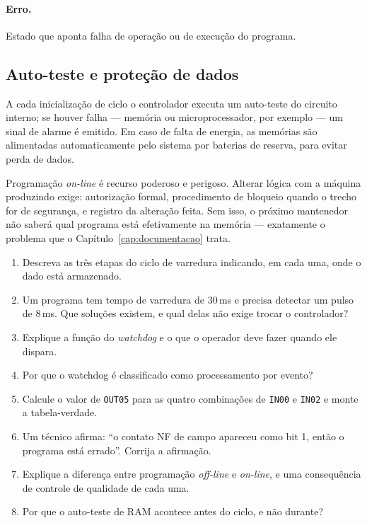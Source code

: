 \paragraph{Erro.} Estado que aponta falha de operação ou de execução do programa.

\subsection{Auto-teste e proteção de dados}

A cada inicialização de ciclo o controlador executa um auto-teste do circuito interno; se houver
falha --- memória ou microprocessador, por exemplo --- um sinal de alarme é emitido. Em caso de falta
de energia, as memórias são alimentadas automaticamente pelo sistema por baterias de reserva, para
evitar perda de dados.

\begin{atencao}
Programação \emph{on-line} é recurso poderoso e perigoso. Alterar lógica com a máquina produzindo
exige: autorização formal, procedimento de bloqueio quando o trecho for de segurança, e registro da
alteração feita. Sem isso, o próximo mantenedor não saberá qual programa está efetivamente na
memória --- exatamente o problema que o Capítulo~\ref{cap:documentacao} trata.
\end{atencao}

\begin{exercicios}
\begin{enumerate}[label=\alph*)]
  \item Descreva as três etapas do ciclo de varredura indicando, em cada uma, onde o dado está
        armazenado.
  \item Um programa tem tempo de varredura de 30\,ms e precisa detectar um pulso de 8\,ms. Que
        soluções existem, e qual delas não exige trocar o controlador?
  \item Explique a função do \emph{watchdog} e o que o operador deve fazer quando ele dispara.
  \item Por que o watchdog é classificado como processamento por evento?
  \item Calcule o valor de \texttt{OUT05} para as quatro combinações de \texttt{IN00} e
        \texttt{IN02} e monte a tabela-verdade.
  \item Um técnico afirma: ``o contato NF de campo apareceu como bit 1, então o programa está
        errado''. Corrija a afirmação.
  \item Explique a diferença entre programação \emph{off-line} e \emph{on-line}, e uma consequência
        de controle de qualidade de cada uma.
  \item Por que o auto-teste de RAM acontece antes do ciclo, e não durante?
\end{enumerate}
\end{exercicios}
